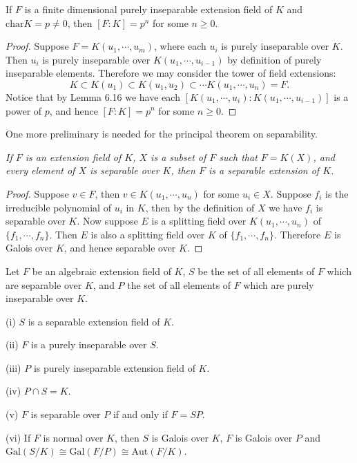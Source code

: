 \begin{corollary}
If $F$ is a finite dimensional purely inseparable extension field of $K$ and $\mathrm{char}K=p\ne 0$, then $[F:K]=p^n$ for some $n\ge 0$.
\end{corollary}
\begin{proof}
Suppose $F=K(u_1,\cdots,u_m)$, where each $u_i$ is purely inseparable over $K$. Then $u_i$ is purely inseparable over $K(u_1,\cdots,u_{i-1})$ by definition of purely inseparable elements. Therefore we may consider the tower of field extensions: 
$$
K\subset K\left( u_1 \right) \subset K\left( u_1,u_2 \right) \subset \cdots K\left( u_1,\cdots ,u_n \right) =F.
$$
Notice that by Lemma 6.16 we have each $[K(u_1,\cdots,u_i):K(u_1,\cdots,u_{i-1})]$ is a power of $p$, and hence $[F:K]=p^n$ for some $n\ge 0$.
\end{proof}
One more preliminary is needed for the principal theorem on separability.
\begin{lemma}\em
If $F$ is an extension field of $K$, $X$ is a subset of $F$ such that $F=K(X)$, and every element of $X$ is separable over $K$, then $F$ is a separable extension of $K$.
\end{lemma}
\begin{proof}
Suppose $v\in F$, then $v\in K(u_1,\cdots,u_n)$ for some $u_i\in X$. Suppose $f_i$ is the irreducible polynomial of $u_i$ in $K$, then by the definition of $X$ we have $f_i$ is separable over $K$. Now suppose $E$ is a splitting field over $K(u_1,\cdots,u_n)$ of $\{f_1,\cdots,f_n\}$. Then $E$ is also a splitting field over $K$ of $\{f_1,\cdots,f_n\}$. Therefore $E$ is Galois over $K$, and hence separable over $K$.
\end{proof}
\begin{theorem}
Let $F$ be an algebraic extension field of $K$, $S$ be the set of all elements of $F$ which are separable over $K$, and $P$ the set of all elements of $F$ which are purely inseparable over $K$.\par
(i) $S$ is a separable extension field of $K$.\par
(ii) $F$ is a purely inseparable over $S$.\par
(iii) $P$ is purely inseparable extension field of $K$.\par
(iv) $P\cap S=K$.\par
(v) $F$ is separable over $P$ if and only if $F=SP$.\par
(vi) If $F$ is normal over $K$, then $S$ is Galois over $K$, $F$ is Galois over $P$ and $\mathrm{Gal}(S/K)\cong\mathrm{Gal}(F/P)\cong\mathrm{Aut}(F/K)$.
\end{theorem}
